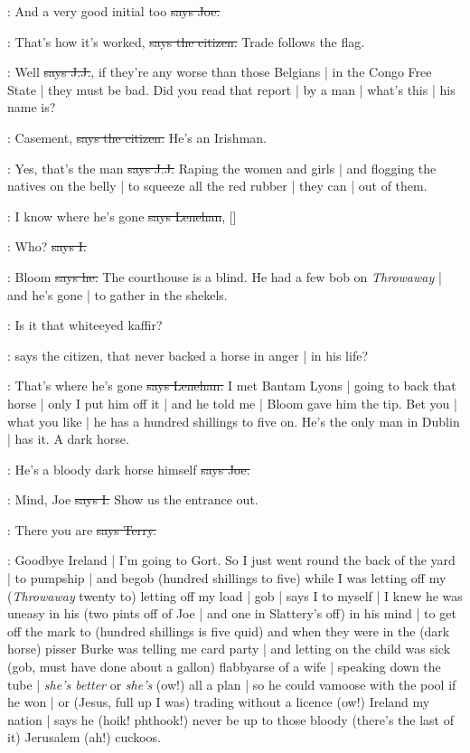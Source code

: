 \joe:
And a very good initial too
\sout{says Joe.}

\citizen:
That's how it's worked,
\sout{says the citizen.}
Trade follows the flag.

\jjom:
Well
\sout{says J.J.},
if they're any worse than those Belgians |
in the Congo Free State |
they must be bad.
Did you read that report |
by a man |
what's this |
his name is?

\citizen:
Casement,
\sout{says the citizen.}
He's an Irishman.

\jjom:
Yes,
that's the man
\sout{says J.J.}
Raping the women and girls |
and flogging the natives on the belly |
to squeeze all the red rubber |
they can |
out of them.

\lenehan:
I know where he's gone
\sout{says Lenehan},
[]

:
Who?
\sout{says I.}

\lenehan:
Bloom
\sout{says he.}
The courthouse is a blind.
He had a few bob on \emph{Throwaway} |
and he's gone |
to gather in the shekels.

\citizen:
Is it that whiteeyed kaffir?

\Nq:
says the citizen,
that never backed a horse in anger |
in his life?

\lenehan:
That's where he's gone
\sout{says Lenehan.}
I met Bantam Lyons |
going to back that horse |
only I put him off it |
and he told me |
Bloom gave him the tip.
Bet you |
what you like |
he has a hundred shillings to five on.
He's the only man in Dublin |
has it.
A dark horse.

\joe:
He's a bloody dark horse himself
\sout{says Joe.}

:
Mind,
Joe
\sout{says I.}
Show us the entrance out.

\terry:
There you are
\sout{says Terry.}

\Nq:
Goodbye Ireland |
I'm going to Gort.
So I just went round the back of the yard |
to pumpship |
and begob
(hundred shillings to five)
while I was letting off my
(\emph{Throwaway} twenty to)
letting off my load |
gob |
says I to myself |
I knew he was uneasy in his
(two pints off of Joe |
and one in Slattery's off)
in his mind |
to get off the mark to
(hundred shillings is five quid)
and when they were in the
(dark horse)
pisser Burke
was telling me card party |
and letting on the child was sick
(gob,
must have done about a gallon)
flabbyarse of a wife |
speaking down the tube |
\emph{she's better} or \emph{she's}
(ow!)
all a plan |
so he could vamoose with the pool if he won |
or
(Jesus,
full up I was)
trading without a licence
(ow!)
Ireland my nation |
says he
(hoik!
phthook!)
never be up to those bloody
(there's the last of it)
Jerusalem
(ah!)
cuckoos.


